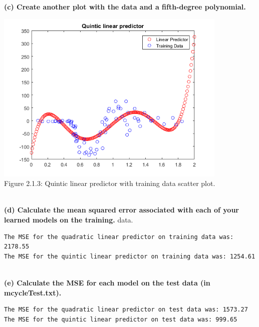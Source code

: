 \documentclass[]{report}   %
\begin{document}
{\bf (c) Create another plot with the data and a fifth-degree polynomial.}
\begin{center}
	\includegraphics[width=30em,keepaspectratio]{2_1_Figure_3.png}\\
	{Figure 2.1.3: Quintic linear predictor with training data scatter plot.}
\end{center}
~\\
{\bf (d) Calculate the mean squared error associated with each of your learned models on the training.}
data.
\begin{lstlisting}[caption=Matlab output for MSE calculations on training data.]
The MSE for the quadratic linear predictor on training data was: 2178.55
The MSE for the quintic linear predictor on training data was: 1254.61
\end{lstlisting}
~\\
{\bf (e) Calculate the MSE for each model on the test data (in mcycleTest.txt).}
\begin{lstlisting}[caption=Matlab output for MSE calculations on test data.]
The MSE for the quadratic linear predictor on test data was: 1573.27
The MSE for the quintic linear predictor on test data was: 999.65
\end{lstlisting}
\end{document}
